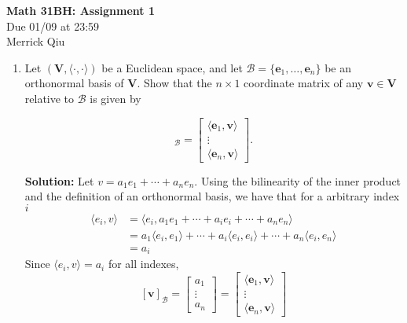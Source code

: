 \documentclass{report}
\newcommand{\solution}{\textbf{Solution: }}
\newcommand{\inner}[2]{\langle #1, #2 \rangle}
\begin{document}
\begin{center}
	\huge{\bf Math 31BH: Assignment 1} \\
	Due 01/09 at 23:59 \\
	Merrick Qiu
\end{center}

\bigskip

\begin{enumerate}

	\item
	Let $(\mathbf{V},\langle \cdot, \cdot\rangle)$ be a Euclidean space, and let 
	$\mathcal{B}=\{\mathbf{e}_1,\dots,\mathbf{e}_n\}$ be an orthonormal basis
	of $\mathbf{V}$. Show that the $n \times 1$ coordinate matrix of any $\mathbf{v} \in \mathbf{V}$ 
	relative to $\mathcal{B}$ is given by
	
		\begin{equation*}
			[\mathbf{v}]_\mathcal{B} = \begin{bmatrix}
				\langle \mathbf{e}_1, \mathbf{v} \rangle \\
				\vdots \\
				\langle \mathbf{e}_n, \mathbf{v} \rangle 
				\end{bmatrix}.
		\end{equation*}
		
	\solution
	Let $v = a_1e_1 + \cdots + a_ne_n$. 
	Using the bilinearity of the inner product 
	and the definition of an orthonormal basis, we have that for a arbitrary index $i$
	\begin{align*}
		\inner{e_i}{v} 
		&= \inner{e_i}{a_1e_1 + \cdots + a_ie_i + \cdots + a_ne_n} \\
		&= a_1\inner{e_i}{e_1} + \cdots + a_i\inner{e_i}{e_i} + \cdots + a_n\inner{e_i}{e_n} \\
		&= a_i
	\end{align*}
	Since $\inner{e_i}{v} = a_i$ for all indexes,
	\[
		[\mathbf{v}]_\mathcal{B} = 
		\begin{bmatrix}
			a_1 \\
			\vdots \\
			a_n
		\end{bmatrix} =
		\begin{bmatrix}
			\langle \mathbf{e}_1, \mathbf{v} \rangle \\
			\vdots \\
			\langle \mathbf{e}_n, \mathbf{v} \rangle 	
		\end{bmatrix}
	\]
	

\end{enumerate}
\end{document}
